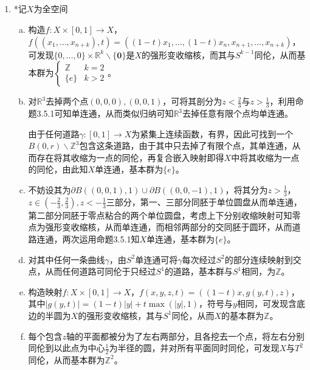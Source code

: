 \documentclass[a4paper,UTF8,fontset=windows]{ctexart}
\begin{document}
\subsection{}
\begin{enumerate}[(1)]
    \item
    *记$X$为全空间
    
    \begin{enumerate}[(a)]
    \item
    构造$f:X\times[0,1]\to X$，$f((x_1,\dots,x_{n+k}),t)=((1-t)x_1,\dots,(1-t)x_n,x_{n+1},\dots,x_{n+k})$，可发现$\{0,\dots,0\}\times\mathbb{R}^k\backslash\{\mathbf{0}\}$是$X$的强形变收缩核，而其与$S^{k-1}$同伦，从而基本群为$\begin{cases}\mathbb{Z}&k=2\\\{e\}&k>2\end{cases}$。
    
    \item
    对$\mathbb{R}^3$去掉两个点$(0,0,0),(0,0,1)$，可将其剖分为$z<\frac{2}{3}$与$z>\frac{1}{3}$，利用命题3.5.1可知单连通，从而类似归纳可知$\mathbb{R}^3$去掉任意有限个点均单连通。
    
    由于任何道路$\gamma:[0,1]\to X$为紧集上连续函数，有界，因此可找到一个$B(0,r)\backslash\mathbb{Z}^3$包含这条道路，由于其中只去掉了有限个点，其单连通，从而存在将其收缩为一点的同伦，再复合嵌入映射即得$X$中将其收缩为一点的同伦，由此知$X$单连通，基本群为$\{e\}$。
    
    \item
    不妨设其为$\partial B((0,0,1),1)\cup\partial B((0,0,-1),1)$，将其分为$z>\frac{1}{3}$，$z\in(-\frac{2}{3},\frac{2}{3}),z<-\frac{1}{3}$三部分，第一、三部分同胚于单位圆盘从而单连通，第二部分同胚于零点粘合的两个单位圆盘，考虑上下分别收缩映射可知零点为强形变收缩核，从而单连通，而相邻两部分的交同胚于圆环，从而道路连通，两次运用命题3.5.1知$X$单连通，基本群为$\{e\}$。
    
    \item
    对其中任何一条曲线$\gamma$，由$S^2$单连通可将$\gamma$每次经过$S^2$的部分连续映射到交点，从而任何道路可同伦于只经过$S^1$的道路，基本群与$S^1$相同，为$\mathbb{Z}$。
    
    \item
    构造映射$f:X\times[0,1]\to X$，$f(x,y,z,t)=((1-t)x,g(y,t),z)$，其中$|g(y,t)|=(1-t)|y|+t\max(|y|,1)$，符号与$y$相同，可发现含底边的半圆为$X$的强形变收缩核，其与$S^1$同伦，从而$X$的基本群为$\mathbb{Z}$。
    
    \item
    每个包含$z$轴的平面都被分为了左右两部分，且各挖去一个点，将左右分别同伦到以此点为中心$\frac{1}{2}$为半径的圆，并对所有平面同时同伦，可发现$X$与$T^2$同伦，从而基本群为$\mathbb{Z}^2$。
    

\end{enumerate}
\end{enumerate}
\end{document}
